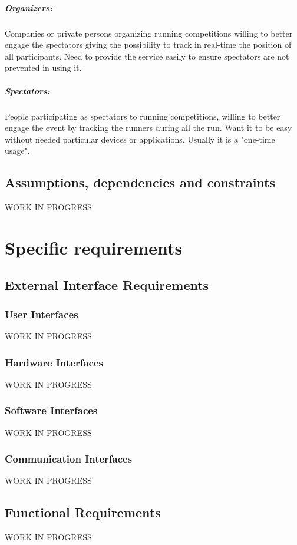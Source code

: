 \documentclass{report}
\begin{document}
			\paragraph{Organizers:}
			Companies or private persons organizing running competitions willing to better engage the spectators giving the possibility to track in real-time the position of all participants. Need to provide the service easily to ensure spectators are not prevented in using it.
			\paragraph{Spectators:}
			People participating as spectators to running competitions, willing to better engage the event by tracking the runners during all the run. Want it to be easy without needed particular devices or applications. Usually it is a "one-time usage".
		\section{Assumptions, dependencies and constraints}
		WORK IN PROGRESS
	\chapter{Specific requirements}
		\section{External Interface Requirements}
			\subsection{User Interfaces}
			WORK IN PROGRESS
			\subsection{Hardware Interfaces}
			WORK IN PROGRESS
			\subsection{Software Interfaces}
			WORK IN PROGRESS
			\subsection{Communication Interfaces}
			WORK IN PROGRESS
		\section{Functional Requirements}
		WORK IN PROGRESS
\end{document}
